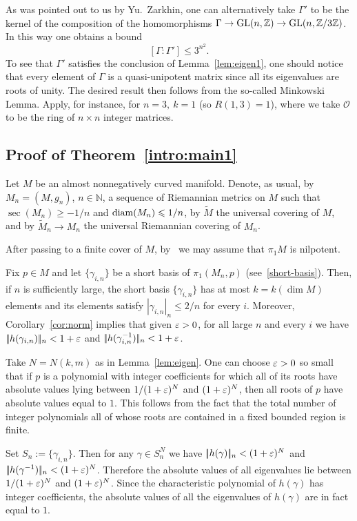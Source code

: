 \documentclass{amsart}
\begin{document}
\begin{rmk}
As was pointed out to us by Yu.~Zarkhin, one can alternatively take
$\Gamma'$ to be the kernel of the composition of the homomorphisms
$\Gamma\to \mathrm{GL}(n,\mathbb{Z})\z\to \mathrm{GL}(n,\mathbb{Z}/3\mathbb{Z})$.
In this way one obtains a bound
$$[\Gamma:\Gamma']\le 3^{n^2}.$$
To see that $\Gamma'$ satisfies the conclusion of
Lemma~\ref{lem:eigen1}, one should notice that every element of
$\Gamma$ is a quasi-unipotent matrix since all its eigenvalues are
roots of unity.
The desired result then follows from the so-called
Minkowski Lemma.
Apply, for instance, \cite[Th. 7.2]{Zar} for $n=3,\
k=1$ (so $R(1,3)=1$), where we take $\mathcal O$ to  be the ring of
$n\times n$ integer matrices.
\end{rmk}


\subsection{Proof of Theorem~\ref{intro:main1}}
Let $M$ be an almost nonnegatively curved manifold.
Denote, as usual, by $M_n=(M,g_n)$, $n\in \mathbb{N}$,
a sequence of Riemannian metrics on $M$ such that $\sec(M_n)\ge -1/n$
and $\operatorname{\rm diam}(M_n)\leqslant 1/n$,
by $\tilde M$ the universal covering of $M$, and by
$\tilde M_n\to M_n$
the universal Riemannian covering of $M_n$.

After passing to a finite cover of $M$, by~\cite{FY}
we may assume that
 $\pi_1M$ is nilpotent.

Fix $p\in M$ and
let $\{\gamma_{i,n}\}$ be a short basis of $\pi_1(M_n,p)$ (see~\ref{short-basis}).
Then, if $n$ is sufficiently large,
the short basis $\{\gamma_{i,n}\}$
has at most $k=k(\dim M)$ elements and
its elements satisfy
$|\gamma_{i,n}|_n\le 2/n$ for every $i$.
Moreover,
Corollary~\ref{cor:norm}  implies
that given $\varepsilon>0$, for all large $n$ and every $i$
we have $|\!|h(\gamma_{i,n})|\!|_n <
1+\varepsilon$ and $|\!|h(\gamma^{-1}_{i,n})|\!|_n<1+\varepsilon$.

Take $N=N(k,m)$ as in Lemma~\ref{lem:eigen}.
One can choose $\varepsilon>0$
so small that
if $p$ is a polynomial with integer coefficients
for which all of its roots have  absolute
values lying between  $1/(1+\varepsilon)^N$ and $(1+\varepsilon)^N$,
then  all roots of $p$ have absolute values equal to $1$.
This follows from the fact
that the total number of integer polynomials
all of whose roots are contained in a fixed bounded region is finite.


Set $S_n:=\{\gamma_{i,n}\}$.
Then for any $\gamma\in S_n^N$ we have
$|\!|h(\gamma)|\!|_n<(1+\varepsilon)^N$ and
$|\!|h(\gamma^{-1})|\!|_n<(1+\varepsilon)^N$.
Therefore the absolute values of all eigenvalues
lie between $1/(1+\varepsilon)^N$ and $(1+\varepsilon)^N$.
Since the characteristic polynomial of $h(\gamma)$
has integer coefficients,
the absolute values of all the eigenvalues of $h(\gamma)$ are
in fact equal to $1$.
\end{document}

